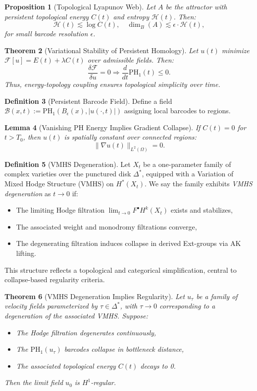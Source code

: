 \documentclass[11pt]{article}
\newtheorem{theorem}{Theorem}[section]
\newtheorem{lemma}[theorem]{Lemma}
\newtheorem{proposition}[theorem]{Proposition}
\theoremstyle{definition}
\newtheorem{definition}[theorem]{Definition}
\begin{document}
\begin{proposition}[Topological Lyapunov Web]
Let $A$ be the attractor with persistent topological energy $C(t)$ and entropy $\mathcal{H}(t)$. Then:
\[
\mathcal{H}(t) \lesssim \log C(t), \quad \dim_B(A) \lesssim \epsilon \cdot \mathcal{H}(t),
\]
for small barcode resolution $\epsilon$.
\end{proposition}

\begin{theorem}[Variational Stability of Persistent Homology]
Let $u(t)$ minimize $\mathcal{F}[u] = E(t) + \lambda C(t)$ over admissible fields. Then:
\[
\frac{\delta \mathcal{F}}{\delta u} = 0 \Rightarrow \frac{d}{dt} \mathrm{PH}_1(t) \le 0.
\]
Thus, energy-topology coupling ensures topological simplicity over time.
\end{theorem}

\begin{definition}[Persistent Barcode Field]
Define a field $\mathcal{B}(x,t) := \mathrm{PH}_1(B_\epsilon(x), |u(\cdot,t)|)$ assigning local barcodes to regions.
\end{definition}

\begin{lemma}[Vanishing PH Energy Implies Gradient Collapse]
If $C(t) = 0$ for $t > T_0$, then $u(t)$ is spatially constant over connected regions:
\[
\|\nabla u(t)\|_{L^2(\Omega)} = 0.
\]
\end{lemma}

\begin{definition}[VMHS Degeneration] \label{def:vmhs-collapse}
Let $X_t$ be a one-parameter family of complex varieties over the punctured disk $\Delta^*$, equipped with a Variation of Mixed Hodge Structure (VMHS) on $H^*(X_t)$.  
We say the family exhibits \emph{VMHS degeneration} as $t \to 0$ if:
\begin{itemize}
  \item The limiting Hodge filtration $\lim_{t \to 0} F^\bullet H^k(X_t)$ exists and stabilizes,
  \item The associated weight and monodromy filtrations converge,
  \item The degenerating filtration induces collapse in derived Ext-groups via AK lifting.
\end{itemize}
This structure reflects a topological and categorical simplification, central to collapse-based regularity criteria.
\end{definition}

\begin{theorem}[VMHS Degeneration Implies Regularity]
Let $u_\tau$ be a family of velocity fields parameterized by $\tau \in \Delta^*$, with $\tau \to 0$ corresponding to a degeneration of the associated VMHS. Suppose:
\begin{itemize}
    \item The Hodge filtration degenerates continuously,
    \item The $\mathrm{PH}_1(u_\tau)$ barcodes collapse in bottleneck distance,
    \item The associated topological energy $C(t)$ decays to 0.
\end{itemize}
Then the limit field $u_0$ is $H^1$-regular.
\end{theorem}
\end{document}
